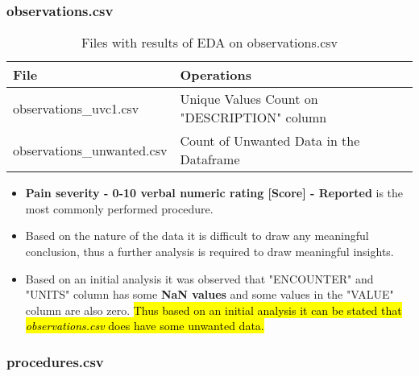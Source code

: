 \documentclass[12pt, twosided]{report}  %
\begin{document}
\subsubsection{observations.csv}

\begin{table}[H]
	\centering
	\begin{tabular}{p{5cm}|p{14.5cm}}
		\textbf{File} & \textbf{Operations} \\ \hline
		observations\_uvc1.csv     & Unique Values Count on "DESCRIPTION" column \\
		observations\_unwanted.csv & Count of Unwanted Data in the Dataframe
		\end{tabular}
	\caption{Files with results of EDA on observations.csv}
\end{table}


\begin{itemize}
%	

\item \textbf{Pain severity - 0-10 verbal numeric rating [Score] - Reported} is the most commonly performed procedure.

\item Based on the nature of the data it is difficult to draw any meaningful conclusion, thus a further analysis is required to draw meaningful insights.

\item Based on an initial analysis it was observed that "ENCOUNTER" and "UNITS" column has some \textbf{NaN values} and some values in the "VALUE" column are also zero. \hl{Thus based on an initial analysis it can be stated that \textit{observations.csv} does have some unwanted data.}

\end{itemize}

\subsubsection{procedures.csv}
\end{document}
